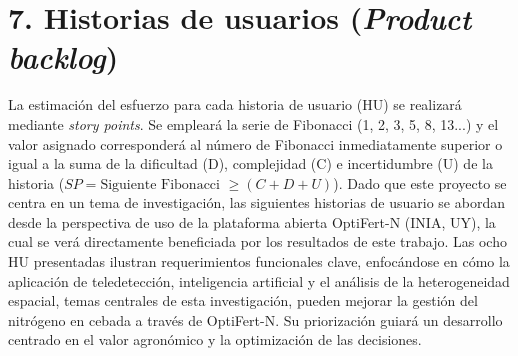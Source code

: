 \documentclass[
11pt, %
]{charter}
\begin{document}
\section{7. Historias de usuarios (\textit{Product backlog})}
\label{sec:backlog}
La estimación del esfuerzo para cada historia de usuario (HU) se realizará mediante \textit{story points}. Se empleará la serie de Fibonacci (1, 2, 3, 5, 8, 13...) y el valor asignado corresponderá al número de Fibonacci inmediatamente superior o igual a la suma de la dificultad (D), complejidad (C) e incertidumbre (U) de la historia ($SP = \text{Siguiente Fibonacci } \geq (C+D+U)$). Dado que este proyecto se centra en un tema de investigación, las siguientes historias de usuario se abordan desde la perspectiva de uso de la plataforma abierta OptiFert-N (INIA, UY), la cual se verá directamente beneficiada por los resultados de este trabajo. Las ocho HU presentadas ilustran requerimientos funcionales clave, enfocándose en cómo la aplicación de teledetección, inteligencia artificial y el análisis de la heterogeneidad espacial, temas centrales de esta investigación, pueden mejorar la gestión del nitrógeno en cebada a través de OptiFert-N. Su priorización guiará un desarrollo centrado en el valor agronómico y la optimización de las decisiones.
\end{document}

